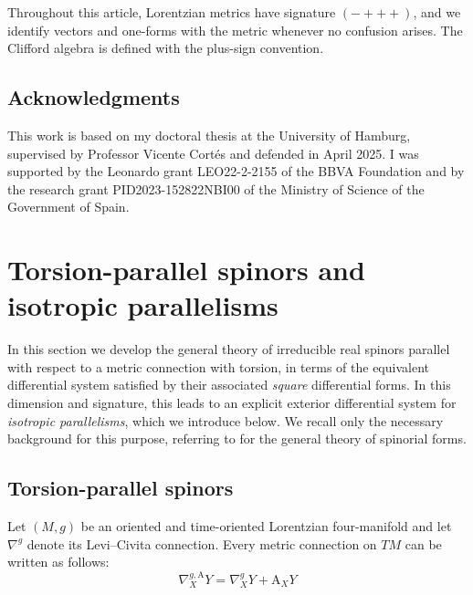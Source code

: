 \documentclass[10pt,reqno,a4paper]{amsart}
\theoremstyle{plain}
\theoremstyle{definition}
\theoremstyle{remark}
\theoremstyle{remark}
\def\mA{\mathrm{A}}
\renewcommand{\(}{ (}
\renewcommand{\)}{ )}
\begin{document}
\noindent
Throughout this article, Lorentzian metrics have signature $(-+++)$, and we identify vectors and one-forms with the metric whenever no confusion arises. The Clifford algebra is defined with the plus-sign convention. 

%

\subsection*{Acknowledgments}

%

This work is based on my doctoral thesis at the University of Hamburg, supervised by Professor Vicente Cortés and defended in April 2025. I was supported by the Leonardo grant LEO22-2-2155 of the BBVA Foundation and by the research grant PID2023-152822NBI00 of the Ministry of Science of the Government of Spain.

%
%

\section{Torsion-parallel spinors and isotropic parallelisms}
\label{sec:torsionparallel}

%
%

In this section we develop the general theory of irreducible real spinors parallel with respect to a metric connection with torsion, in terms of the equivalent differential system satisfied by their associated \emph{square} differential forms. In this dimension and signature, this leads to an explicit exterior differential system for \emph{isotropic parallelisms}, which we introduce below.  We recall only the necessary background for this purpose, referring to \cite{Cortes:2019xmk,ShahbaziTesis} for the general theory of spinorial forms.  

%

\subsection{Torsion-parallel spinors}
\label{sec:metric-torsion-spinors}

%

Let $(M,g)$ be an oriented and time-oriented Lorentzian four-manifold and let $\nabla^g$ denote its Levi--Civita connection.  Every metric connection on $TM$ can be written as follows:
\begin{equation*} 
\nabla^{g,\mA}_X Y = \nabla^g_X Y + \mA_X Y
\end{equation*}
\end{document}
